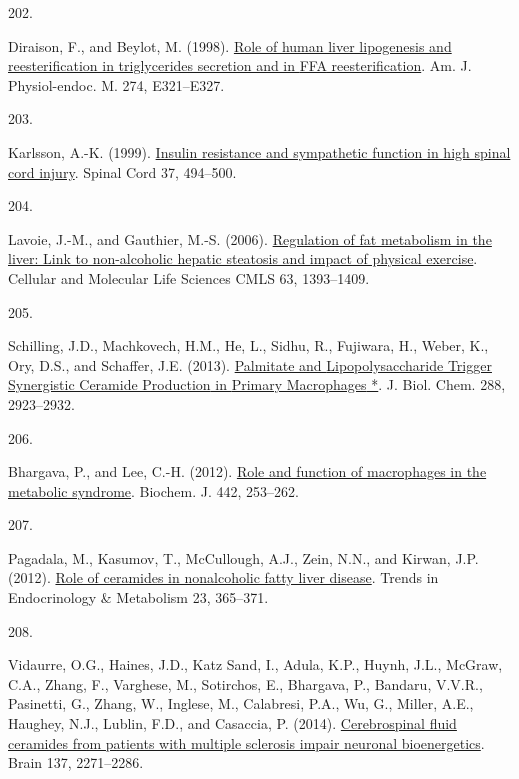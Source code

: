 \documentclass[
]{article}
\newlength{\cslhangindent}
\newlength{\csllabelwidth}
\newlength{\cslentryspacingunit} %
\newenvironment{CSLReferences}[2] %
 {%
  \setlength{\parindent}{0pt}
  \ifodd #1
  \let\oldpar\par
  \def\par{\hangindent=\cslhangindent\oldpar}
  \fi
  \setlength{\parskip}{#2\cslentryspacingunit}
 }%
 {}
\newcommand{\CSLLeftMargin}[1]{\parbox[t]{\csllabelwidth}{#1}}
\newcommand{\CSLRightInline}[1]{\parbox[t]{\linewidth - \csllabelwidth}{#1}\break}
\begin{document}
\begin{CSLReferences}{0}{0}
\leavevmode{}%
\CSLLeftMargin{202. }
\CSLRightInline{Diraison, F., and Beylot, M. (1998). \href{https://doi.org/10.1152/ajpendo.1998.274.2.E321}{Role of human liver lipogenesis and reesterification in triglycerides secretion and in {FFA} reesterification}. Am. J. Physiol-endoc. M. 274, E321--E327.}

\leavevmode{}%
\CSLLeftMargin{203. }
\CSLRightInline{Karlsson, A.-K. (1999). \href{https://doi.org/10.1038/sj.sc.3100844}{Insulin resistance and sympathetic function in high spinal cord injury}. Spinal Cord 37, 494--500.}

\leavevmode{}%
\CSLLeftMargin{204. }
\CSLRightInline{Lavoie, J.-M., and Gauthier, M.-S. (2006). \href{https://doi.org/10.1007/s00018-006-6600-y}{Regulation of fat metabolism in the liver: Link to non-alcoholic hepatic steatosis and impact of physical exercise}. Cellular and Molecular Life Sciences CMLS 63, 1393--1409.}

\leavevmode{}%
\CSLLeftMargin{205. }
\CSLRightInline{Schilling, J.D., Machkovech, H.M., He, L., Sidhu, R., Fujiwara, H., Weber, K., Ory, D.S., and Schaffer, J.E. (2013). \href{https://doi.org/10.1074/jbc.M112.419978}{Palmitate and {Lipopolysaccharide Trigger Synergistic Ceramide Production} in {Primary Macrophages} *}. J. Biol. Chem. 288, 2923--2932.}

\leavevmode{}%
\CSLLeftMargin{206. }
\CSLRightInline{Bhargava, P., and Lee, C.-H. (2012). \href{https://doi.org/10.1042/BJ20111708}{Role and function of macrophages in the metabolic syndrome}. Biochem. J. 442, 253--262.}

\leavevmode{}%
\CSLLeftMargin{207. }
\CSLRightInline{Pagadala, M., Kasumov, T., McCullough, A.J., Zein, N.N., and Kirwan, J.P. (2012). \href{https://doi.org/10.1016/j.tem.2012.04.005}{Role of ceramides in nonalcoholic fatty liver disease}. Trends in Endocrinology \& Metabolism 23, 365--371.}

\leavevmode{}%
\CSLLeftMargin{208. }
\CSLRightInline{Vidaurre, O.G., Haines, J.D., Katz Sand, I., Adula, K.P., Huynh, J.L., McGraw, C.A., Zhang, F., Varghese, M., Sotirchos, E., Bhargava, P., Bandaru, V.V.R., Pasinetti, G., Zhang, W., Inglese, M., Calabresi, P.A., Wu, G., Miller, A.E., Haughey, N.J., Lublin, F.D., and Casaccia, P. (2014). \href{https://doi.org/10.1093/brain/awu139}{Cerebrospinal fluid ceramides from patients with multiple sclerosis impair neuronal bioenergetics}. Brain 137, 2271--2286.}


\end{CSLReferences}
\end{document}
